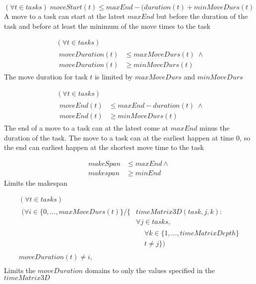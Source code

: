 \documentclass[10pt,a4paper]{report}
\begin{document}
\begin{equation}\label{eq:63}
(\forall t \in tasks) \; moveStart(t) \le maxEnd-(duration(t)+minMoveDurs(t)\end{equation}
A move to a task can start at the latest $maxEnd$ but before the duration of the task and before at least the minimum of the move times to the task

\begin{equation}
\begin{aligned}\label{eq:64}
&(\forall t \in tasks)\\
&\begin{aligned}
moveDuration(t) &\le maxMoveDurs(t) \; \land\\
moveDuration(t) &\ge minMoveDurs(t)
\end{aligned}
\end{aligned}
\end{equation}
The move duration for task $t$ is limited by $maxMoveDurs$ and $minMoveDurs$

\begin{equation}
\begin{aligned}\label{eq:65}
&(\forall t \in tasks)\\
&\begin{aligned}
moveEnd(t) &\le maxEnd - duration(t) \; \land\\
moveEnd(t) &\ge minMoveDurs(t)
\end{aligned}
\end{aligned}
\end{equation}
The end of a move to a task can at the latest come at $maxEnd$ minus the duration of the task. The move to a task can at the earliest happen at time 0, so the end can earliest happen at the shortest move time to the task

\begin{equation}\label{eq:66}
\begin{aligned}
makeSpan &\le maxEnd \land\\
makespan &\ge minEnd
\end{aligned}
\end{equation}
Limits the makespan

\begin{equation}
\begin{aligned}\label{eq:67}
&(\forall t \in tasks)\\
&\begin{aligned}
(\forall i \in \{0 , \ldots , maxMoveDurs(t)\} / \{&timeMatrix3D(task,j,k) :\\
&\forall j \in tasks,\\
&\begin{aligned}
&\forall k \in \{1 , \ldots , timeMatrixDepth\}\\
&t \neq j\})
\end{aligned}
\end{aligned}\\
&moveDuration(t) \neq i, \\
\end{aligned}
\end{equation}
Limits the $moveDuration$ domains to only the values specified in the $timeMatrix3D$
\end{document}
